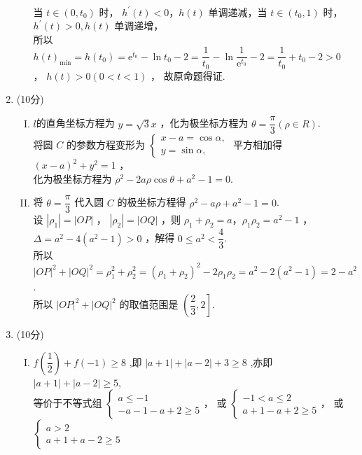 \documentclass[11pt]{article}
\begin{document}
\begin{enumerate}
\begin{enumerate}[(I)]
		\\当 $t \in\left(0, t_{0}\right)$ 时， $h^{\prime}(t)<0 ， h(t)$ 单调递减，当 $t \in\left(t_{0}, 1\right)$ 时， $h^{\prime}(t)>0 , h(t)$ 单调递增，
		\\所以 $h(t)_{\min }=h\left(t_{0}\right)=\mathrm{e}^{t_{0}}-\ln t_{0}-2=\dfrac{1}{t_{0}}-\ln \dfrac{1}{\mathrm{e}^{t_{0}}}-2=\dfrac{1}{t_{0}}+t_{0}-2>0$ ，
		$h(t)>0(0<t<1)$ ， 故原命题得证.
	\end{enumerate}
	\item (10分)
	\begin{enumerate}[(I)]
		\item $ l $的直角坐标方程为 $y=\sqrt{3} x$ ，化为极坐标方程为 $\theta=\dfrac{\pi}{3}(\rho \in R)$. 
		\\将圆 $C$ 的参数方程变形为 $\left\{\begin{array}{l}x-a=\cos \alpha, \\ y=\sin \alpha,\end{array}\right.$ 平方相加得 $(x-a)^{2}+y^{2}=1$ ， 
		\\化为极坐标方程为 $\rho^{2}-2 a \rho \cos \theta+a^{2}-1=0$.
		\item 将 $\theta=\dfrac{\pi}{3}$ 代入圆 $C$ 的极坐标方程得 $\rho^{2}-a \rho+a^{2}-1=0$.
		\\设 $\left|\rho_{1}\right|=|O P|$ ， $\left|\rho_{2}\right|=|O Q|$ ，则 $\rho_{1}+\rho_{2}=a ， \rho_{1} \rho_{2}=a^{2}-1$ ，
		\\$\Delta=a^{2}-4\left(a^{2}-1\right)>0$ ，解得 $0 \leq a^{2}<\dfrac{4}{3}$.
		\\所以 $|O P|^{2}+|O Q|^{2}=\rho_{1}^{2}+\rho_{2}^{2}=\left(\rho_{1}+\rho_{2}\right)^{2}-2 \rho_{1} \rho_{2}=a^{2}-2\left(a^{2}-1\right)=2-a^{2}$. 
		\\所以 $|O P|^{2}+|O Q|^{2}$ 的取值范围是 $\left(\dfrac{2}{3}, 2\right]$.
	\end{enumerate}
	\item (10分)
	\begin{enumerate}[(I)]
		\item $f\left(\dfrac{1}{2}\right)+f(-1) \geq 8 $ ,即 $|a+1|+|a-2|+3 \geq 8 $ ,亦即 $|a+1|+|a-2| \geq 5 $,
		\\等价于不等式组 $\left\{\begin{array}{l}a \leq-1 \\ -a-1-a+2 \geq 5\end{array} ，\right.$ 或 $\left\{\begin{array}{l}-1<a \leq 2 \\ a+1-a+2 \geq 5\end{array} ，\right.$ 或 $\left\{\begin{array}{l}a>2 \\ a+1+a-2 \geq 5\end{array}\right.$ 

\end{enumerate}
\end{enumerate}
\end{document}
